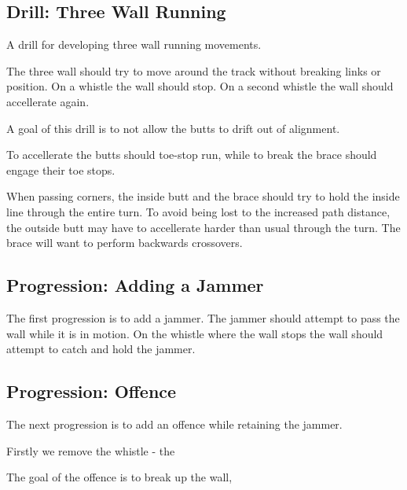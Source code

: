 \subsection*{Drill: Three Wall Running} 
\label{drill:three_wall:running}

A drill for developing three wall running movements.

The three wall should try to move around the track without breaking links or position.
On a whistle the wall should stop.
On a second whistle the wall should accellerate again. 

A goal of this drill is to not allow the butts to drift out of alignment.

To accellerate the butts should toe-stop run, while to break the brace should engage their toe stops.

When passing corners, the inside butt and the brace should try to hold the inside line through the entire turn.
To avoid being lost to the increased path distance, the outside butt may have to accellerate harder than usual through the turn.  
The brace will want to perform backwards crossovers.
 

\subsection*{Progression: Adding a Jammer}
\label{drill:three_wall:running:jammer}

The first progression is to add a jammer.
The jammer should attempt to pass the wall while it is in motion.
On the whistle where the wall stops the wall should attempt to catch and hold the jammer.


\subsection*{Progression: Offence}
The next progression is to add an offence while retaining the jammer. 

Firstly we remove the whistle - the  

The goal of the offence is to break up the wall,  

